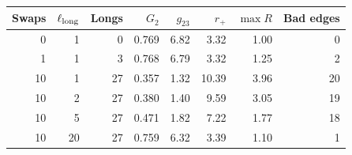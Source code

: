 \begin{tabular}{rrrrrrrr}
\toprule
Swaps & $\ell_{\rm long}$ & Longs & $G_2$ & $g_{23}$ & $r_+$ & $\max R$ & Bad edges \\
\midrule
0 & 1 & 0 & 0.769 & 6.82 & 3.32 & 1.00 & 0 \\
1 & 1 & 3 & 0.768 & 6.79 & 3.32 & 1.25 & 2 \\
10 & 1 & 27 & 0.357 & 1.32 & 10.39 & 3.96 & 20 \\
10 & 2 & 27 & 0.380 & 1.40 & 9.59 & 3.05 & 19 \\
10 & 5 & 27 & 0.471 & 1.82 & 7.22 & 1.77 & 18 \\
10 & 20 & 27 & 0.759 & 6.32 & 3.39 & 1.10 & 1 \\
\bottomrule
\end{tabular}
